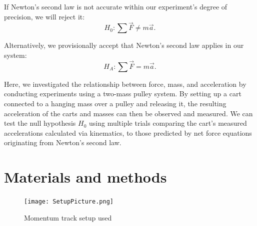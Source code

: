 \documentclass[reprint,amsmath,amssymb,aps,twoside]{revtex4-2}
\begin{document}
If Newton’s second law is not accurate within our experiment's degree of precision, we will reject it:
\begin{equation} 
    H_0: \sum\vec{F} \neq m\vec{a}.
    \label{eq:1}
\end{equation}

Alternatively, we provisionally accept that Newton’s second law applies in our system:
\begin{equation} 
    H_A: \sum\vec{F} = m\vec{a}.
    \label{eq:n2l}
\end{equation}

Here, we investigated the relationship between force, mass, and acceleration by conducting experiments using a two-mass pulley system. By setting up a cart connected to a hanging mass over a pulley and releasing it, the resulting acceleration of the carts and masses can then be observed and measured. We can test the null hypothesis $H_0$ using multiple trials comparing the cart's measured accelerations calculated via kinematics, to those predicted by net force equations originating from Newton's second law.








\section{Materials and methods}\label{sec:methods}
\begin{figure}%
\begin{center}
\texttt{[image: SetupPicture.png]}
\end{center}    
\caption{Momentum track setup used}
\label{fig:1}
\end{figure}
\end{document}
